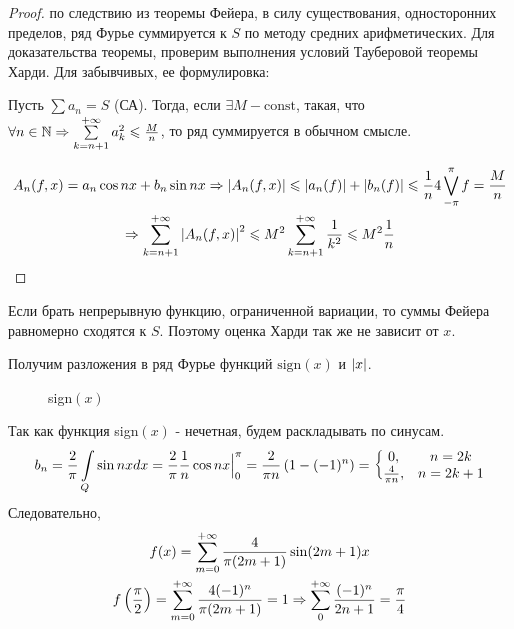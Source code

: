 \begin{proof}
	по следствию из теоремы Фейера, в силу существования, односторонних пределов, 
	ряд Фурье суммируется к $S$ по методу средних арифметических.
	Для доказательства теоремы, проверим выполнения условий Тауберовой теоремы Харди.
	Для забывчивых, ее формулировка:
	
	\begin{theorem}
		Пусть $\sum a_n = S$ (СА). Тогда, если $\exists M - \text{const}$, такая, что
		$\forall n \in \mathbb{N} \Rightarrow 
		\sum\limits_{k = n + 1}^{+\infty}a_k^2\leqslant \frac{M}{n}$, то ряд суммируется в обычном смысле.
	\end{theorem}

	\begin{gather*}
		A_n(f, x) = a_n \cos nx + b_n \sin nx \Rightarrow
		\left|A_n(f, x)\right| \leqslant \left|a_n(f)\right| + \left|b_n(f)\right|
		\leqslant \frac{1}{n}4\bigvee\limits_{-\pi}^{\pi}f  = \frac{M}{n}\\ \Rightarrow
		\sum\limits_{k = n + 1}^{+\infty}\left|A_n(f, x)\right|^2 \leqslant 
		M^2 \sum\limits_{k = n + 1}^{+\infty} \frac{1}{k^2} \leqslant
		M^2 \frac{1}{n}
	\end{gather*}
\end{proof}

Если брать непрерывную функцию, ограниченной вариации, то суммы Фейера равномерно сходятся к $S$.
Поэтому оценка Харди так же не зависит от $x$. 

Получим разложения в ряд Фурье функций $\text{sign}(x)$ и $\left|x\right|$.



\begin{figure}[h]
\centering
{}
	\caption{sign$(x)$}	
\end{figure}

Так как функция sign$(x)$ - нечетная, будем раскладывать по синусам.
\begin{gather*}
	b_n = \frac{2}{\pi}\int\limits_{Q} \sin nx dx = 
	\frac{2}{\pi} \frac{1}{n}\cos nx \Big|_{0}^{\pi} = 
	\frac{2}{\pi n} \left(1 - (-1)^n\right) = 
	\left\{\begin{matrix}
		0, & n = 2k \\
		\frac{4}{\pi n}, & n = 2k + 1
	\end{matrix}\right.
\end{gather*}
Следовательно, 
\begin{gather*}
	f(x) = \sum\limits_{m = 0}^{+\infty} \frac{4}{\pi (2m + 1)} \sin (2m + 1) x \\
	f\left(\frac{\pi}{2}\right) = \sum\limits_{m = 0}^{+\infty} \frac{4(-1)^n}{\pi(2m + 1)} = 1 \Rightarrow
	\sum\limits_{0}^{+\infty} \frac{(-1)^n}{2n + 1} = \frac{\pi}{4}
\end{gather*}


